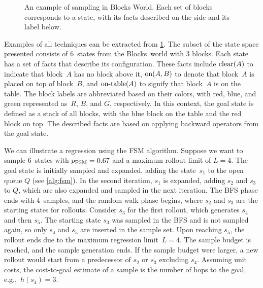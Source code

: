 \begin{figure}[tb]
    \caption[An example of sampling in Blocks World.]{An example of sampling in Blocks World. Each set of blocks corresponds to a state, with its facts described on the side and its label below.}
    \label{fig:example}
    \addmargin
    \centering
    
\end{figure}

Examples of all techniques can be extracted from \cref{fig:example}. The subset of the state space presented consists of $6$~states from the Blocks~world with $3$ blocks. Each state has a set of facts that describe its configuration. These facts include $\text{clear}(A)$ to indicate that block~$A$ has no block above it, $\text{on}(A,B)$ to denote that block~$A$ is placed on top of block~$B$, and $\text{on-table}(A)$ to signify that block~$A$ is on the table. The block labels are abbreviated based on their colors, with red, blue, and green represented as~$R$, $B$, and $G$, respectively. In this context, the goal state is defined as a stack of all blocks, with the blue block on the table and the red block on top. The described facts are based on applying backward operators from the goal state.

We can illustrate a regression using the FSM algorithm. Suppose we want to sample $6$~states with $p_{\text{FSM}}=0.67$ and a maximum rollout limit of $L=4$. The goal state is initially sampled and expanded, adding the state~$s_1$ to the open queue $Q$ (see \cref{alg:fsm}). In the second iteration, $s_1$ is expanded, adding $s_2$ and $s_3$ to $Q$, which are also expanded and sampled in the next iteration. The BFS phase ends with $4$~samples, and the random walk phase begins, where $s_2$ and $s_3$ are the starting states for rollouts. Consider $s_3$ for the first rollout, which generates $s_4$ and then $s_5$. The starting state $s_3$ was sampled in the BFS and is not sampled again, so only $s_4$ and $s_5$ are inserted in the sample set. Upon reaching $s_5$, the rollout ends due to the maximum regression limit~$L = 4$. The sample budget is reached, and the sample generation ends. If the sample budget were larger, a new rollout would start from a predecessor of $s_2$ or $s_3$ excluding $s_4$. Assuming unit costs, the cost-to-goal estimate of a sample is the number of hops to the goal, e.g.,~$h(s_4)=3$.

